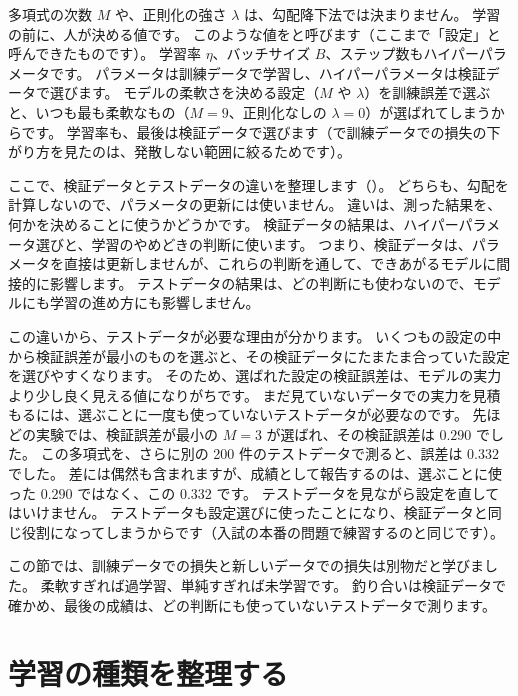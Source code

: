多項式の次数 $M$ や、正則化の強さ $\lambda$ は、勾配降下法では決まりません。
学習の前に、人が決める値です。
このような値をと呼びます（ここまで「設定」と呼んできたものです）。
学習率 $\eta$、バッチサイズ $B$、ステップ数もハイパーパラメータです。
パラメータは訓練データで学習し、ハイパーパラメータは検証データで選びます。
モデルの柔軟さを決める設定（$M$ や $\lambda$）を訓練誤差で選ぶと、いつも最も柔軟なもの（$M=9$、正則化なしの $\lambda=0$）が選ばれてしまうからです。
学習率も、最後は検証データで選びます（で訓練データでの損失の下がり方を見たのは、発散しない範囲に絞るためです）。

ここで、検証データとテストデータの違いを整理します（）。
どちらも、勾配を計算しないので、パラメータの更新には使いません。
違いは、測った結果を、何かを決めることに使うかどうかです。
検証データの結果は、ハイパーパラメータ選びと、学習のやめどきの判断に使います。
つまり、検証データは、パラメータを直接は更新しませんが、これらの判断を通して、できあがるモデルに間接的に影響します。
テストデータの結果は、どの判断にも使わないので、モデルにも学習の進め方にも影響しません。

この違いから、テストデータが必要な理由が分かります。
いくつもの設定の中から検証誤差が最小のものを選ぶと、その検証データにたまたま合っていた設定を選びやすくなります。
そのため、選ばれた設定の検証誤差は、モデルの実力より少し良く見える値になりがちです。
まだ見ていないデータでの実力を見積もるには、選ぶことに一度も使っていないテストデータが必要なのです。
先ほどの実験では、検証誤差が最小の $M=3$ が選ばれ、その検証誤差は $0.290$ でした。
この多項式を、さらに別の 200 件のテストデータで測ると、誤差は $0.332$ でした。
差には偶然も含まれますが、成績として報告するのは、選ぶことに使った $0.290$ ではなく、この $0.332$ です。
テストデータを見ながら設定を直してはいけません。
テストデータも設定選びに使ったことになり、検証データと同じ役割になってしまうからです（入試の本番の問題で練習するのと同じです）。

この節では、訓練データでの損失と新しいデータでの損失は別物だと学びました。
柔軟すぎれば過学習、単純すぎれば未学習です。
釣り合いは検証データで確かめ、最後の成績は、どの判断にも使っていないテストデータで測ります。

\section{学習の種類を整理する}\label{sec:ml-map}

